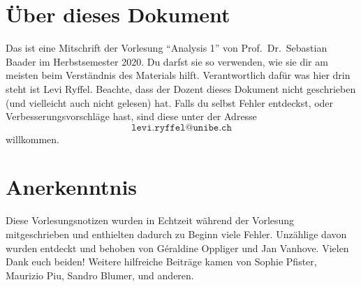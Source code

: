\documentclass[../main.tex]{subfiles}
\begin{document}
\section*{Über dieses Dokument}
Das ist eine Mitschrift
der Vorlesung ``Analysis 1''
von Prof.\ Dr.\ Sebastian Baader
im Herbstsemester 2020.
Du darfst sie so verwenden,
wie sie dir am meisten
beim Verständnis des Materials
hilft.
Verantwortlich dafür was
hier drin steht ist Levi Ryffel.
Beachte, dass der Dozent dieses Dokument
nicht geschrieben (und vielleicht auch nicht gelesen) hat.
Falls du selbst Fehler entdeckst, oder Verbesserungsvorschläge hast,
sind diese unter der Adresse
\[
  \texttt{levi.ryffel@unibe.ch}
\]
willkommen.



\section*{Anerkenntnis}
Diese Vorlesungsnotizen wurden in Echtzeit während der Vorlesung mitgeschrieben
und enthielten dadurch zu Beginn viele Fehler.
Unzählige davon wurden entdeckt und behoben
von Géraldine Oppliger und Jan Vanhove.
Vielen Dank euch beiden! Weitere hilfreiche Beiträge kamen
von Sophie Pfister, Maurizio Piu, Sandro Blumer, und anderen.
\end{document}
